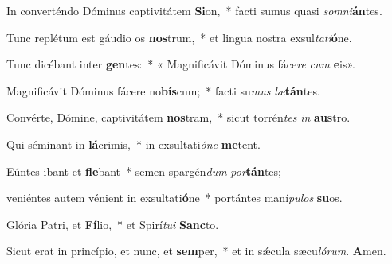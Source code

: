 \item In converténdo Dóminus captivitátem \textbf{Si}on,~* facti sumus quasi \textit{som}\textit{ni}\textbf{án}tes.

\item Tunc replétum est gáudio os \textbf{nos}trum,~* et lingua nostra exsul\textit{ta}\textit{ti}\textbf{ó}ne.

\item Tunc dicébant inter \textbf{gen}tes:~* « Magnificávit Dóminus fáce\textit{re} \textit{cum} \textbf{e}is».

\item Magnificávit Dóminus fácere no\textbf{bís}cum;~* facti su\textit{mus} \textit{læ}\textbf{tán}tes.

\item Convérte, Dómine, captivitátem \textbf{nos}tram,~* sicut torrén\textit{tes} \textit{in} \textbf{aus}tro.

\item Qui séminant in \textbf{lá}crimis,~* in exsultati\textit{ó}\textit{ne} \textbf{me}tent.

\item Eúntes ibant et \textbf{fle}bant~* semen spargén\textit{dum} \textit{por}\textbf{tán}tes;

\item veniéntes autem vénient in exsultati\textbf{ó}ne~* portántes maní\textit{pu}\textit{los} \textbf{su}os.

\item Glória Patri, et \textbf{Fí}lio,~* et Spirí\textit{tu}\textit{i} \textbf{Sanc}to.

\item Sicut erat in princípio, et nunc, et \textbf{sem}per,~* et in sǽcula sæcu\textit{ló}\textit{rum}. \textbf{A}men.